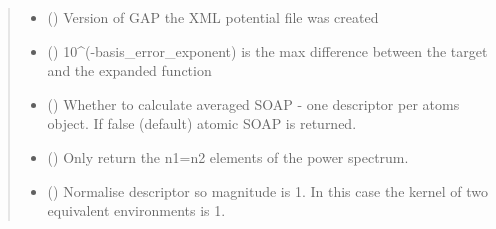 \documentclass[letterpaper,10pt,english]{sphinxmanual}
\begin{document}
\begin{fulllineitems}
\begin{fulllineitems}
\begin{quote}
\begin{description}
\begin{itemize}
\item {} 
 () \textendash{} Version of GAP the XML potential file was created

\item {} 
 () \textendash{} 10\textasciicircum{}(-basis\_error\_exponent) is the max difference between the target and the expanded function

\item {} 
 () \textendash{} Whether to calculate averaged SOAP - one descriptor per atoms object. If false (default) atomic SOAP is returned.

\item {} 
 () \textendash{} Only return the n1=n2 elements of the power spectrum.

\item {} 
 () \textendash{} Normalise descriptor so magnitude is 1. In this case the kernel of two equivalent environments is 1.

\end{itemize}

\end{description}\end{quote}

\end{fulllineitems}


\end{fulllineitems}

\end{document}
